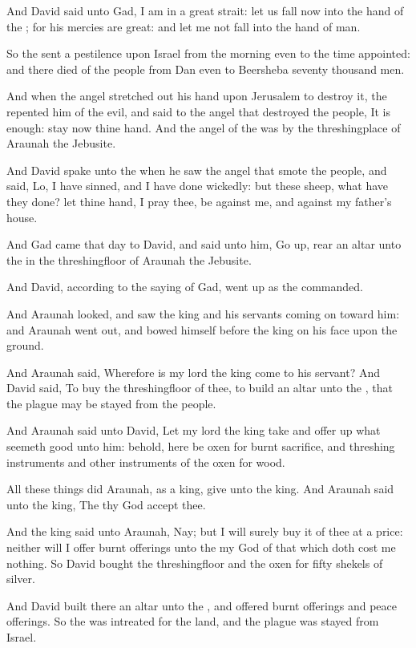 \Verse And David said unto Gad, I am in a great strait: let us fall now into the hand of the \LORD; for his mercies are great: and let me not fall into the hand of man.

\Verse So the \LORD sent a pestilence upon Israel from the morning even to the time appointed: and there died of the people from Dan even to Beersheba seventy thousand men.

\Verse And when the angel stretched out his hand upon Jerusalem to destroy it, the \LORD repented him of the evil, and said to the angel that destroyed the people, It is enough: stay now thine hand. And the angel of the \LORD was by the threshingplace of Araunah the Jebusite.

\Verse And David spake unto the \LORD when he saw the angel that smote the people, and said, Lo, I have sinned, and I have done wickedly: but these sheep, what have they done? let thine hand, I pray thee, be against me, and against my father's house.

\Verse And Gad came that day to David, and said unto him, Go up, rear an altar unto the \LORD in the threshingfloor of Araunah the Jebusite.

\Verse And David, according to the saying of Gad, went up as the \LORD commanded.

\Verse And Araunah looked, and saw the king and his servants coming on toward him: and Araunah went out, and bowed himself before the king on his face upon the ground.

\Verse And Araunah said, Wherefore is my lord the king come to his servant?  And David said, To buy the threshingfloor of thee, to build an altar unto the \LORD, that the plague may be stayed from the people.

\Verse And Araunah said unto David, Let my lord the king take and offer up what seemeth good unto him: behold, here be oxen for burnt sacrifice, and threshing instruments and other instruments of the oxen for wood.

\Verse All these things did Araunah, as a king, give unto the king. And Araunah said unto the king, The \LORD thy God accept thee.

\Verse And the king said unto Araunah, Nay; but I will surely buy it of thee at a price: neither will I offer burnt offerings unto the \LORD my God of that which doth cost me nothing. So David bought the threshingfloor and the oxen for fifty shekels of silver.

\Verse And David built there an altar unto the \LORD, and offered burnt offerings and peace offerings. So the \LORD was intreated for the land, and the plague was stayed from Israel.

